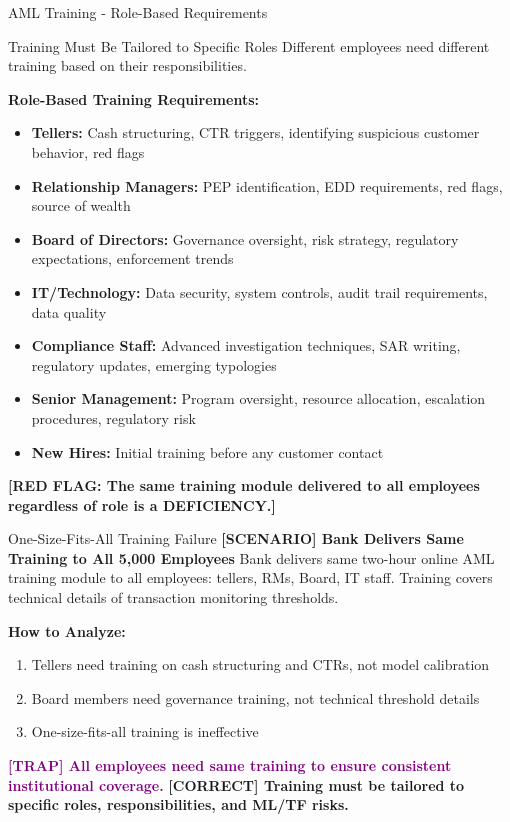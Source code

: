 \documentclass[11pt,a4paper]{beamer}
\newcommand{\trap}[1]{\textcolor{purple}{\textbf{[TRAP] #1}}}
\newcommand{\correct}[1]{\textcolor{green!50!black}{\textbf{[CORRECT] #1}}}
\newcommand{\scenario}[1]{\textcolor{blue!70!black}{\textbf{[SCENARIO] #1}}}
\newcommand{\redflag}[1]{\textcolor{red!80!black}{\textbf{[RED FLAG: #1]}}}
\begin{document}
	\begin{frame}{AML Training - Role-Based Requirements}
		\begin{block}{Training Must Be Tailored to Specific Roles}
			Different employees need different training based on their responsibilities.
		\end{block}
		\textbf{Role-Based Training Requirements:}
		\begin{itemize}
			\item \textbf{Tellers:} Cash structuring, CTR triggers, identifying suspicious customer behavior, red flags
			\item \textbf{Relationship Managers:} PEP identification, EDD requirements, red flags, source of wealth
			\item \textbf{Board of Directors:} Governance oversight, risk strategy, regulatory expectations, enforcement trends
			\item \textbf{IT/Technology:} Data security, system controls, audit trail requirements, data quality
			\item \textbf{Compliance Staff:} Advanced investigation techniques, SAR writing, regulatory updates, emerging typologies
			\item \textbf{Senior Management:} Program oversight, resource allocation, escalation procedures, regulatory risk
			\item \textbf{New Hires:} Initial training before any customer contact
		\end{itemize}
		\redflag{The same training module delivered to all employees regardless of role is a DEFICIENCY.}
	\end{frame}
	
	\begin{frame}{One-Size-Fits-All Training Failure}
		\scenario{Bank Delivers Same Training to All 5,000 Employees}
		Bank delivers same two-hour online AML training module to all employees: tellers, RMs, Board, IT staff. Training covers technical details of transaction monitoring thresholds.
		
		\vspace{0.1cm}
		\textbf{How to Analyze:}
		\begin{enumerate}
			\item Tellers need training on cash structuring and CTRs, not model calibration
			\item Board members need governance training, not technical threshold details
			\item One-size-fits-all training is ineffective
		\end{enumerate}
		\trap{All employees need same training to ensure consistent institutional coverage.}
		\correct{Training must be tailored to specific roles, responsibilities, and ML/TF risks.}
	\end{frame}
	
\end{document}
